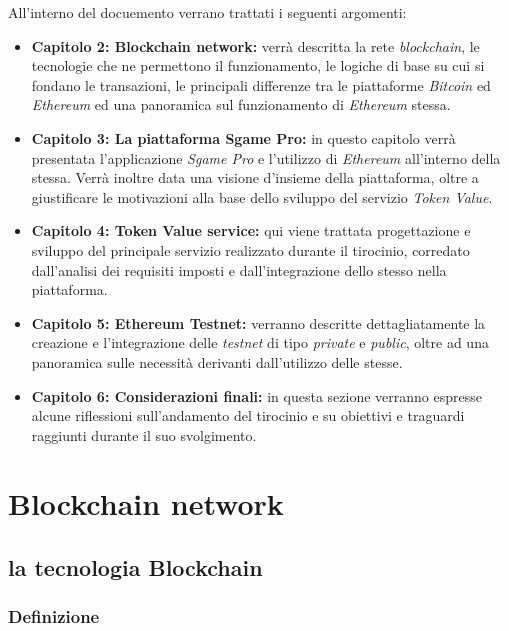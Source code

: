 \documentclass[11pt]{thesistemp}
\begin{document}
All'interno del docuemento verrano trattati i seguenti argomenti: 
\begin{itemize}
	\item \textbf{Capitolo 2: Blockchain network:} verrà descritta la rete \textit{blockchain}, le tecnologie che ne permettono il funzionamento, le logiche di base su cui si fondano le transazioni, le principali differenze tra le piattaforme \textit{Bitcoin} ed \textit{Ethereum} ed una panoramica sul funzionamento di \textit{Ethereum} stessa.
	\item \textbf{Capitolo 3: La piattaforma Sgame Pro:} in questo capitolo verrà presentata l'applicazione \textit{Sgame Pro} e l'utilizzo di \textit{Ethereum} all'interno della stessa. Verrà inoltre data una visione d'insieme della piattaforma, oltre a giustificare le motivazioni alla base dello sviluppo del servizio \textit{Token Value}.
	\item \textbf{Capitolo 4: Token Value service:} qui viene trattata progettazione e sviluppo del principale servizio realizzato durante il tirocinio, corredato dall'analisi dei requisiti imposti e dall'integrazione dello stesso nella piattaforma.
	\item \textbf{Capitolo 5: Ethereum Testnet:} verranno descritte dettagliatamente la creazione e l'integrazione delle \textit{testnet} di tipo \textit{private} e \textit{public}, oltre ad una panoramica sulle necessità derivanti dall'utilizzo delle stesse.
	\item \textbf{Capitolo 6: Considerazioni finali:} in questa sezione verranno espresse alcune riflessioni sull'andamento del tirocinio e su obiettivi e traguardi raggiunti durante il suo svolgimento.
\end{itemize}

\pagebreak
\section{Blockchain network}

\subsection{la tecnologia Blockchain}

\subsubsection{Definizione}
\end{document}
